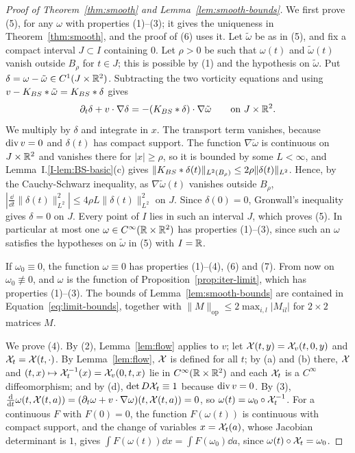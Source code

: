 \begin{proof}[Proof of Theorem~\ref{thm:smooth} and Lemma~\ref{lem:smooth-bounds}]
We first prove (5), for any $\omega$ with properties (1)--(3); it gives the
uniqueness in Theorem~\ref{thm:smooth}, and the proof of (6) uses it. Let $\tilde\omega$
be as in (5), and fix a compact interval $J\subset I$ containing $0$. Let
$\rho>0$ be such that $\omega(t)$ and $\tilde\omega(t)$ vanish outside $B_\rho$ for
$t\in J$; this is possible by (1) and the hypothesis on $\tilde\omega$. Put
$\delta=\omega-\tilde\omega\in C^1(J\times\mathbb{R}^2)$. Subtracting the two
vorticity equations and using $v-K_{BS}\ast\tilde\omega=K_{BS}\ast\delta$ gives
\[
\partial_t\delta+v\cdot\nabla\delta=-(K_{BS}\ast\delta)\cdot\nabla\tilde\omega
\qquad\text{on }J\times\mathbb{R}^2 .
\]
We multiply by $\delta$ and integrate in $x$. The transport term vanishes,
because $\operatorname{div} v=0$ and $\delta(t)$ has compact support. The function
$\nabla\tilde\omega$ is continuous on $J\times\mathbb{R}^2$ and vanishes there for
$|x|\ge\rho$, so it is bounded by some $L<\infty$, and
Lemma~I.\ref{I-lem:BS-basic}(c) gives $\|K_{BS}\ast\delta(t)\|_{L^2(B_\rho)}\le2\rho\|\delta(t)\|_{L^2}$.
Hence, by the Cauchy-Schwarz inequality, as $\nabla\tilde\omega(t)$ vanishes
outside $B_\rho$,
$|\frac{\dd}{\dd t}\|\delta(t)\|_{L^2}^2|\le4\rho L\|\delta(t)\|_{L^2}^2$ on
$J$. Since $\delta(0)=0$, Gronwall's inequality gives $\delta=0$ on $J$. Every
point of $I$ lies in such an interval $J$, which proves (5). In particular at
most one $\omega\in C^\infty(\mathbb{R}\times\mathbb{R}^2)$ has properties (1)--(3), since such
an $\omega$ satisfies the hypotheses on $\tilde\omega$ in (5) with $I=\mathbb{R}$.

If $\omega_0\equiv0$, the function $\omega\equiv0$ has properties (1)--(4), (6)
and (7). From now on $\omega_0\not\equiv0$, and $\omega$ is the function of
Proposition~\ref{prop:iter-limit}, which has properties (1)--(3). The bounds of
Lemma~\ref{lem:smooth-bounds} are contained in Equation~\eqref{eq:limit-bounds},
together with $\|M\|_{\mathrm{op}}\le2\max_{i,l}|M_{il}|$ for $2\times2$ matrices
$M$.

We prove (4). By (2), Lemma~\ref{lem:flow} applies to $v$; let
$\mathcal{X}(t,y)=\mathcal{X}_v(t,0,y)$ and $\mathcal{X}_t=\mathcal{X}(t,\cdot)$. By Lemma~\ref{lem:flow},
$\mathcal{X}$ is defined for all $t$; by (a) and (b) there, $\mathcal{X}$ and
$(t,x)\mapsto\mathcal{X}_t^{-1}(x)=\mathcal{X}_v(0,t,x)$ lie in $C^\infty(\mathbb{R}\times\mathbb{R}^2)$ and
each $\mathcal{X}_t$ is a $C^\infty$ diffeomorphism; and by (d),
$\det D\mathcal{X}_t\equiv1$ because $\operatorname{div} v=0$. By (3),
$\frac{\dd}{\dd t}\omega(t,\mathcal{X}(t,a))=(\partial_t\omega+v\cdot\nabla\omega)(t,\mathcal{X}(t,a))=0$,
so $\omega(t)=\omega_0\circ\mathcal{X}_t^{-1}$. For a continuous $F$ with $F(0)=0$,
the function $F(\omega(t))$ is continuous with compact support, and the change
of variables $x=\mathcal{X}_t(a)$, whose Jacobian determinant is $1$, gives
$\int F(\omega(t))\dd x=\int F(\omega_0)\dd a$, since
$\omega(t)\circ\mathcal{X}_t=\omega_0$.


\end{proof}
